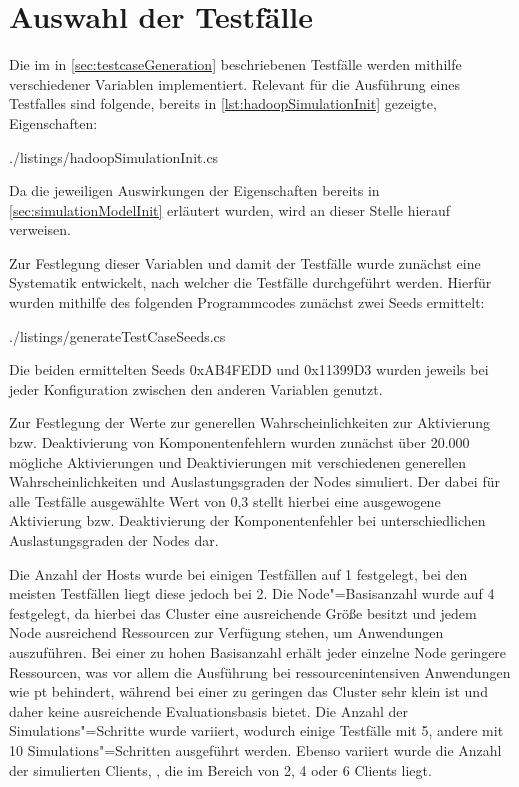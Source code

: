 \section{Auswahl der Testfälle}
\label{sec:selectTestcases}

Die im in \autoref{sec:testcaseGeneration} beschriebenen Testfälle werden mithilfe verschiedener Variablen implementiert.
Relevant für die Ausführung eines Testfalles sind folgende, bereits in \autoref{lst:hadoopSimulationInit} gezeigte, Eigenschaften:


{./listings/hadoopSimulationInit.cs}

Da die jeweiligen Auswirkungen der Eigenschaften bereits in \autoref{sec:simulationModelInit} erläutert wurden, wird an dieser Stelle hierauf verweisen.

Zur Festlegung dieser Variablen und damit der Testfälle wurde zunächst eine Systematik entwickelt, nach welcher die Testfälle durchgeführt werden.
Hierfür wurden mithilfe des folgenden Programmcodes zunächst zwei Seeds ermittelt:


{./listings/generateTestCaseSeeds.cs}

Die beiden ermittelten Seeds 0xAB4FEDD und 0x11399D3 wurden jeweils bei jeder Konfiguration zwischen den anderen Variablen genutzt.

Zur Festlegung der Werte zur generellen Wahrscheinlichkeiten zur Aktivierung bzw. Deaktivierung von Komponentenfehlern wurden zunächst über 20.000 mögliche Aktivierungen und Deaktivierungen mit verschiedenen generellen Wahrscheinlichkeiten und Auslastungsgraden der Nodes simuliert.
Der dabei für alle Testfälle ausgewählte Wert von 0,3 stellt hierbei eine ausgewogene Aktivierung bzw. Deaktivierung der Komponentenfehler bei unterschiedlichen Auslastungsgraden der Nodes dar.

Die Anzahl der Hosts wurde bei einigen Testfällen auf 1 festgelegt, bei den meisten Testfällen liegt diese jedoch bei 2.
Die Node"=Basisanzahl wurde auf 4 festgelegt, da hierbei das Cluster eine ausreichende Größe besitzt und jedem Node ausreichend Ressourcen zur Verfügung stehen, um Anwendungen auszuführen.
Bei einer zu hohen Basisanzahl erhält jeder einzelne Node geringere Ressourcen, was vor allem die Ausführung bei ressourcenintensiven Anwendungen wie \zB \acl{pt} behindert, während bei einer zu geringen das Cluster sehr klein ist und daher keine ausreichende Evaluationsbasis bietet.
Die Anzahl der Simulations"=Schritte wurde variiert, wodurch einige Testfälle mit 5, andere mit 10 Simulations"=Schritten ausgeführt werden.
Ebenso variiert wurde die Anzahl der simulierten Clients, , die im Bereich von 2, 4 oder 6 Clients liegt.

